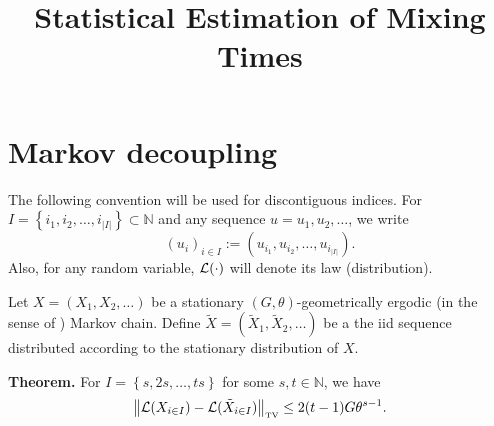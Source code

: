 \documentclass[11pt]{article}
\title{Statistical Estimation of Mixing Times}
\newcommand{\set}[1]{\left\{#1\right\}}
\theoremstyle{plain}
\theoremstyle{definition}
\theoremstyle{remark}
\newcommand{\N}{\mathbb{N}}
\newcommand{\nrm}[1]{\left\Vert #1 \right\Vert}
\newcommand{\TV}[1]{\nrm{#1}_{\textrm{{\tiny \textup{TV}}}}}
\begin{document}
\maketitle




\section{Markov decoupling}

The following convention will be used for discontiguous indices. For 
$I
=\set{i_1,i_2,\ldots,i_{|I|}}
\subset\N
$ and
any sequence $u=u_1,u_2,\ldots$,
we write
$$
(u_i)_{i\in I}:=(u_{i_1},u_{i_2},\ldots,u_{i_{|I|}}).
$$
Also, for any random variable, $\cal L(\cdot)$ will denote its
law (distribution).


Let $X=(X_1,X_2,\ldots)$ be a 
stationary
$(G,\theta)$-geometrically ergodic
(in the sense of \cite{meroi2012-jap})
Markov chain.
Define
$\tilde X=(\tilde X_1,\tilde X_2,\ldots)$ be a 
the iid sequence
distributed according to 
the stationary distribution of $X$.


{\bf Theorem.}
For $I=\set{s,2s,\ldots,ts}$ for some $s,t\in\N$, we have
$$
\TV{{\cal L}(X_{i\in I}) - {\cal L}(\tilde X_{i\in I})}
\le 
2(t-1)G\theta^{s-1}
.
$$







\end{document}
